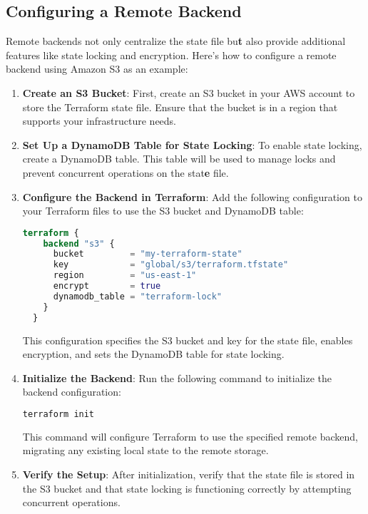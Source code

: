 \subsection{Configuring a Remote Backend}

Remote backends not only centralize the state file bu\textbf{t} also provide additional features like state locking and encryption. Here's how to configure a remote backend using Amazon S3 as an example:

\begin{enumerate}
  \item \textbf{Create an S3 Bucket}: First, create an S3 bucket in your AWS account to store the Terraform state file. Ensure that the bucket is in a region that supports your infrastructure needs.

  \item \textbf{Set Up a DynamoDB Table for State Locking}: To enable state locking, create a DynamoDB table. This table will be used to manage locks and prevent concurrent operations on the stat\textbf{e} file.

  \item \textbf{Configure the Backend in Terraform}: Add the following configuration to your Terraform files to use the S3 bucket and DynamoDB table:

  \begin{lstlisting}[language=terraform]
  terraform {
    backend "s3" {
      bucket         = "my-terraform-state"
      key            = "global/s3/terraform.tfstate"
      region         = "us-east-1"
      encrypt        = true
      dynamodb_table = "terraform-lock"
    }
  }
  \end{lstlisting}

  This configuration specifies the S3 bucket and key for the state file, enables encryption, and sets the DynamoDB table for state locking.

  \item \textbf{Initialize the Backend}: Run the following command to initialize the backend configuration:

  \begin{lstlisting}[language=bash]
  terraform init
  \end{lstlisting}

  This command will configure Terraform to use the specified remote backend, migrating any existing local state to the remote storage.

  \item \textbf{Verify the Setup}: After initialization, verify that the state file is stored in the S3 bucket and that state locking is functioning correctly by attempting concurrent operations.
\end{enumerate}

